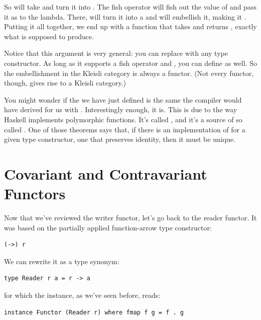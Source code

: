 So  will take  and turn it into
. The fish operator will fish out the value of
 and pass it as  to the lambda. There, 
will turn it into a  and  will embellish it,
making it . Putting it all together, we end up with a
function that takes  and returns ,
exactly what  is supposed to produce.

Notice that this argument is very general: you can replace
 with any type constructor. As long as it supports a fish
operator and , you can define  as well. So
the embellishment in the Kleisli category is always a functor. (Not
every functor, though, gives rise to a Kleisli category.)

You might wonder if the  we have just defined is the same
 the compiler would have derived for us with
. Interestingly enough, it is. This is due to
the way Haskell implements polymorphic functions. It's called
, and it's a source of so called
. One of those theorems says that, if there is
an implementation of  for a given type constructor, one
that preserves identity, then it must be unique.

\section{Covariant and Contravariant
Functors}\label{covariant-and-contravariant-functors}

Now that we've reviewed the writer functor, let's go back to the reader
functor. It was based on the partially applied function-arrow type
constructor:

\begin{verbatim}
(->) r
\end{verbatim}

We can rewrite it as a type synonym:

\begin{verbatim}
type Reader r a = r -> a
\end{verbatim}

for which the  instance, as we've seen before, reads:

\begin{verbatim}
instance Functor (Reader r) where fmap f g = f . g
\end{verbatim}

